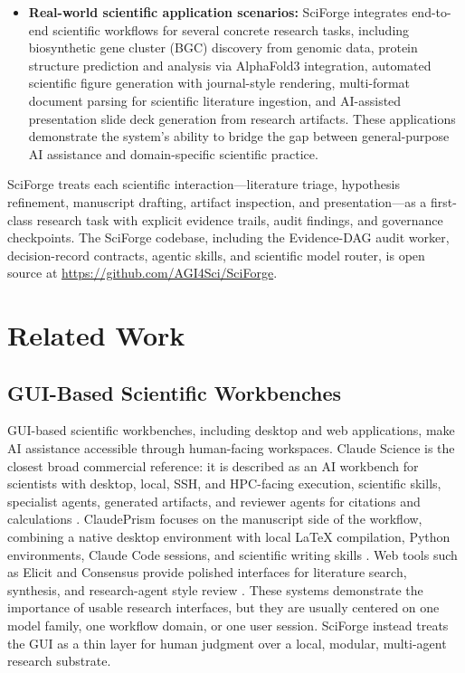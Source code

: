 \documentclass[sn-basic,Numbered,pdflatex]{sn-jnl}
\begin{document}
\begin{itemize}
    \item \textbf{Real-world scientific application scenarios:} SciForge integrates end-to-end scientific workflows for several concrete research tasks, including biosynthetic gene cluster (BGC) discovery from genomic data, protein structure prediction and analysis via AlphaFold3 integration, automated scientific figure generation with journal-style rendering, multi-format document parsing for scientific literature ingestion, and AI-assisted presentation slide deck generation from research artifacts. These applications demonstrate the system's ability to bridge the gap between general-purpose AI assistance and domain-specific scientific practice.
\end{itemize}

SciForge treats each scientific interaction---literature triage, hypothesis refinement, manuscript drafting, artifact inspection, and presentation---as a first-class research task with explicit evidence trails, audit findings, and governance checkpoints. The SciForge codebase, including the Evidence-DAG audit worker, decision-record contracts, agentic skills, and scientific model router, is open source at \url{https://github.com/AGI4Sci/SciForge}.

\section{Related Work}

\subsection{GUI-Based Scientific Workbenches}

GUI-based scientific workbenches, including desktop and web applications, make AI assistance accessible through human-facing workspaces. Claude Science is the closest broad commercial reference: it is described as an AI workbench for scientists with desktop, local, SSH, and HPC-facing execution, scientific skills, specialist agents, generated artifacts, and reviewer agents for citations and calculations \cite{anthropicClaudeScience2026}. ClaudePrism focuses on the manuscript side of the workflow, combining a native desktop environment with local LaTeX compilation, Python environments, Claude Code sessions, and scientific writing skills \cite{claudePrism2026}. Web tools such as Elicit and Consensus provide polished interfaces for literature search, synthesis, and research-agent style review \cite{elicit2026,consensus2026}. These systems demonstrate the importance of usable research interfaces, but they are usually centered on one model family, one workflow domain, or one user session. SciForge instead treats the GUI as a thin layer for human judgment over a local, modular, multi-agent research substrate.
\end{document}
